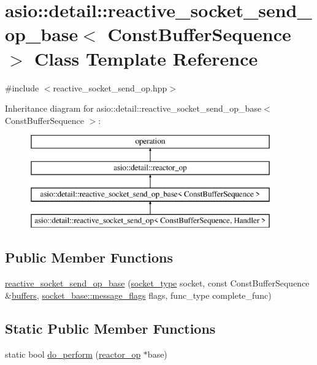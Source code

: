 \hypertarget{classasio_1_1detail_1_1reactive__socket__send__op__base}{}\section{asio\+:\+:detail\+:\+:reactive\+\_\+socket\+\_\+send\+\_\+op\+\_\+base$<$ Const\+Buffer\+Sequence $>$ Class Template Reference}
\label{classasio_1_1detail_1_1reactive__socket__send__op__base}


{\ttfamily \#include $<$reactive\+\_\+socket\+\_\+send\+\_\+op.\+hpp$>$}

Inheritance diagram for asio\+:\+:detail\+:\+:reactive\+\_\+socket\+\_\+send\+\_\+op\+\_\+base$<$ Const\+Buffer\+Sequence $>$\+:\begin{figure}[H]
\begin{center}
\leavevmode
\includegraphics[height=4.000000cm]{classasio_1_1detail_1_1reactive__socket__send__op__base}
\end{center}
\end{figure}
\subsection*{Public Member Functions}
\begin{DoxyCompactItemize}
\item 
\hyperlink{classasio_1_1detail_1_1reactive__socket__send__op__base_ad69d5eb8164cdd85af3a6e4edf81ef82}{reactive\+\_\+socket\+\_\+send\+\_\+op\+\_\+base} (\hyperlink{namespaceasio_1_1detail_a6798c771dd84b79798b1a08150706ea9}{socket\+\_\+type} socket, const Const\+Buffer\+Sequence \&\hyperlink{group__async__read_ga54dede45c3175148a77fe6635222c47d}{buffers}, \hyperlink{classasio_1_1socket__base_ac3cf77465dfedfe1979b5415cf32cc94}{socket\+\_\+base\+::message\+\_\+flags} flags, func\+\_\+type complete\+\_\+func)
\end{DoxyCompactItemize}
\subsection*{Static Public Member Functions}
\begin{DoxyCompactItemize}
\item 
static bool \hyperlink{classasio_1_1detail_1_1reactive__socket__send__op__base_a9fffc5c7a2de602eb552e925890ce8b3}{do\+\_\+perform} (\hyperlink{classasio_1_1detail_1_1reactor__op}{reactor\+\_\+op} $\ast$base)
\end{DoxyCompactItemize}
